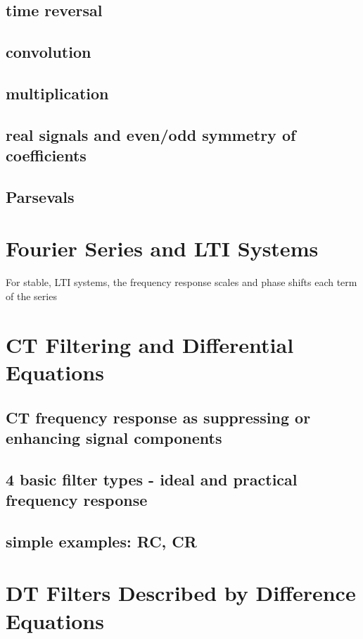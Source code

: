 \documentclass{article}
\begin{document}
\subsection{time reversal}
\label{sec:org31bf958}
\subsection{convolution}
\label{sec:orgdefee2c}
\subsection{multiplication}
\label{sec:orge18d485}
\subsection{real signals and even/odd symmetry of coefficients}
\label{sec:org836e5ec}
\subsection{Parsevals}
\label{sec:org701c799}

\newpage
\section{Fourier Series and LTI Systems}
\label{sec:org292ffbc}
For stable, LTI systems, the frequency response scales and phase shifts each term of the series
\section{CT Filtering and Differential Equations}
\label{sec:orgf36132d}
\subsection{CT frequency response as suppressing or enhancing signal components}
\label{sec:org6a27264}
\subsection{4 basic filter types - ideal and practical frequency response}
\label{sec:orgb1ed6ac}
\subsection{simple examples: RC, CR}
\label{sec:org0734828}

\newpage
\section{DT Filters Described by Difference Equations}
\label{sec:org2b6b730}
\end{document}
